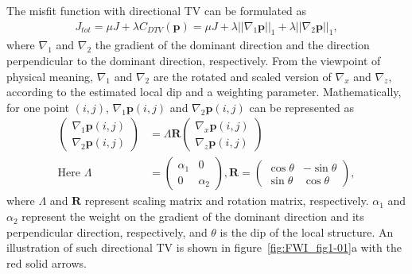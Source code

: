 The misfit function with directional TV can be formulated as
\begin{equation}
\begin{split}
      J_{tot} = \mu J + \lambda C_{DTV} \left(\mathbf{p} \right) = \mu J + \lambda ||\nabla_1 \mathbf{p}||_1 + \lambda ||\nabla_2 \mathbf{p}||_1,
\label{eq3:J with DTV}
\end{split}
\end{equation}
where $\nabla_1$ and $\nabla_2$  the gradient  of the dominant direction and the direction perpendicular to the dominant direction, respectively. From the viewpoint of physical meaning, $\nabla_1$ and $\nabla_2$ are the rotated and scaled version of $\nabla_x$ and $\nabla_z$, according to the estimated local dip and a weighting parameter. Mathematically, for one point $\left(i,j\right)$, $\nabla_1 \mathbf{p}\left(i,j\right)$ and $\nabla_2 \mathbf{p}\left(i,j\right)$ can be represented as
\begin{equation}
\begin{split}
      \begin{pmatrix}
      \nabla_1 \mathbf{p}\left(i,j\right)\\\nabla_2 \mathbf{p}\left(i,j\right)
      \end{pmatrix} 
      &=\Lambda \mathbf{R} \begin{pmatrix}\nabla_x \mathbf{p}\left(i,j\right)\\\nabla_z \mathbf{p}\left(i,j\right)\end{pmatrix}\\
       \text{Here~} \Lambda &= 
      \begin{pmatrix}
      \alpha_1 & 0 \\
      0 & \alpha_2
	  \end{pmatrix}, \mathbf{R} = 
      \begin{pmatrix}
      \cos \theta & -\sin \theta \\
      \sin \theta & \cos \theta
	  \end{pmatrix},
\label{eq4:DTV}
\end{split}
\end{equation}
where $\Lambda$ and $\mathbf{R}$ represent scaling matrix and rotation matrix, respectively. $\alpha_1$ and $\alpha_2$ represent the weight on the gradient of the dominant direction and its perpendicular direction, respectively, and $\theta$ is the dip of the local structure. An illustration of such  directional TV is shown in figure~\ref{fig:FWI_fig1-01}a with the red solid arrows.

